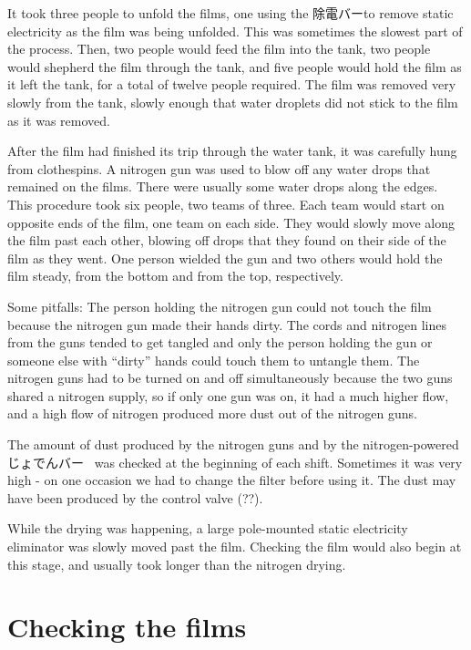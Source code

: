 \documentclass{article}
\begin{document}
It took three people to unfold the films, one using the 除電バーto remove static electricity as the film was being unfolded. This was sometimes the slowest part of the process. Then, two people would feed the film into the tank, two people would shepherd the film through the tank, and five people would hold the film as it left the tank, for a total of twelve people required. The film was removed very slowly from the tank, slowly enough that water droplets did not stick to the film as it was removed. 

After the film had finished its trip through the water tank, it was carefully hung from clothespins. A nitrogen gun was used to blow off any water drops that remained on the films. There were usually some water drops along the edges. This procedure took six people, two teams of three. Each team would start on opposite ends of the film, one team on each side. They would slowly move along the film past each other, blowing off drops that they found on their side of the film as they went. One person wielded the gun and two others would hold the film steady, from the bottom and from the top, respectively. 

Some pitfalls: The person holding the nitrogen gun could not touch the film because the nitrogen gun made their hands dirty. The cords and nitrogen lines from the guns tended to get tangled and only the person holding the gun or someone else with ``dirty'' hands could touch them to untangle them.  The nitrogen guns had to be turned on and off simultaneously because the two guns shared a nitrogen supply, so if only one gun was on, it had a much higher flow, and a high flow of nitrogen produced more dust out of the nitrogen guns.  

The amount of dust produced by the nitrogen guns and by the nitrogen-powered じょでんバー\mbox{ } was checked at the beginning of each shift. Sometimes it was very high - on one occasion we had to change the filter before using it. The dust may have been produced by the control valve (??). 

While the drying was happening, a large pole-mounted static electricity eliminator was slowly moved past the film.  Checking the film would also begin at this stage, and usually took longer than the nitrogen drying. 

\section{Checking the films}
\end{document}
